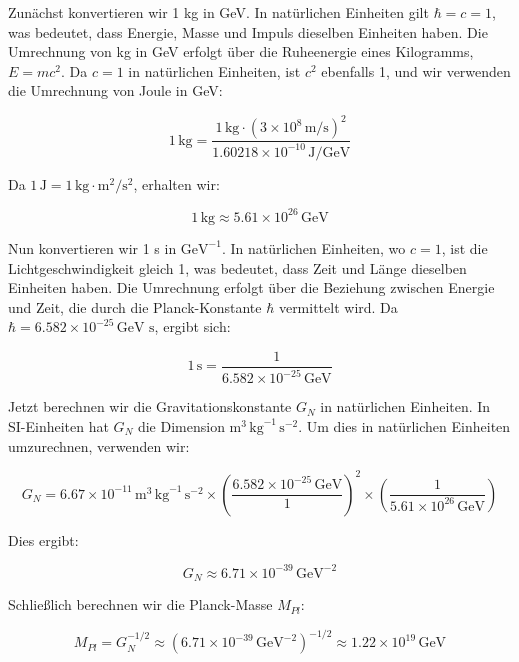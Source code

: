 Zunächst konvertieren wir 1 kg in GeV. In natürlichen Einheiten gilt $\hbar = c = 1$, was bedeutet, dass Energie, Masse und Impuls dieselben Einheiten haben. Die Umrechnung von kg in GeV erfolgt über die Ruheenergie eines Kilogramms, $E = mc^2$. Da $c = 1$ in natürlichen Einheiten, ist $c^2$ ebenfalls 1, und wir verwenden die Umrechnung von Joule in GeV:

\[
1 \, \text{kg} = \frac{1 \, \text{kg} \cdot (3 \times 10^8 \, \text{m/s})^2}{1.60218 \times 10^{-10} \, \text{J/GeV}}
\]

Da $1 \, \text{J} = 1 \, \text{kg} \cdot \text{m}^2/\text{s}^2$, erhalten wir:

\[
1 \, \text{kg} \approx 5.61 \times 10^{26} \, \text{GeV}
\]

Nun konvertieren wir 1 s in $\mathrm{GeV}^{-1}$. In natürlichen Einheiten, wo $c = 1$, ist die Lichtgeschwindigkeit gleich 1, was bedeutet, dass Zeit und Länge dieselben Einheiten haben. Die Umrechnung erfolgt über die Beziehung zwischen Energie und Zeit, die durch die Planck-Konstante $\hbar$ vermittelt wird. Da $\hbar = 6.582 \times 10^{-25} \, \text{GeV s}$, ergibt sich:

\[
1 \, \text{s} = \frac{1}{6.582 \times 10^{-25} \, \text{GeV}}
\]

Jetzt berechnen wir die Gravitationskonstante $G_N$ in natürlichen Einheiten. In SI-Einheiten hat $G_N$ die Dimension $\mathrm{m}^3 \, \mathrm{kg}^{-1} \, \mathrm{s}^{-2}$. Um dies in natürlichen Einheiten umzurechnen, verwenden wir:

\[
G_N = 6.67 \times 10^{-11} \, \mathrm{m}^3 \, \mathrm{kg}^{-1} \, \mathrm{s}^{-2} \times \left( \frac{6.582 \times 10^{-25} \, \text{GeV}}{1} \right)^2 \times \left( \frac{1}{5.61 \times 10^{26} \, \text{GeV}} \right)
\]

Dies ergibt:

\[
G_N \approx 6.71 \times 10^{-39} \, \text{GeV}^{-2}
\]

Schließlich berechnen wir die Planck-Masse $M_{Pl}$:

\[
M_{Pl} = G_N^{-1/2} \approx (6.71 \times 10^{-39} \, \text{GeV}^{-2})^{-1/2} \approx 1.22 \times 10^{19} \, \text{GeV}
\]